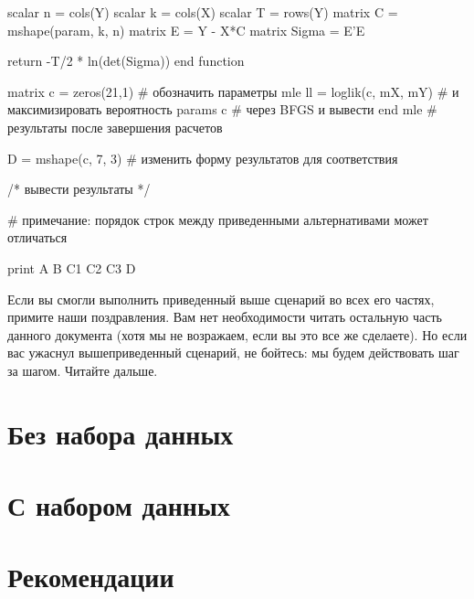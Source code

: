 \documentclass[oneside]{book}
\begin{document}
\begin{scode}
    scalar n = cols(Y)
    scalar k = cols(X)
    scalar T = rows(Y)
    matrix C = mshape(param, k, n)
    matrix E = Y - X*C
    matrix Sigma = E'E

    return -T/2 * ln(det(Sigma))
end function

matrix c = zeros(21,1)                  # обозначить параметры
mle ll = loglik(c, mX, mY)              # и максимизировать вероятность
    params c                            # через BFGS и вывести 
end mle                                 # результаты после завершения расчетов

D = mshape(c, 7, 3)                     # изменить форму результатов для соответствия

/* вывести результаты */

# примечание: порядок строк между приведенными альтернативами может отличаться

print A B C1 C2 C3 D
\end{scode}

Если вы смогли выполнить приведенный выше сценарий во всех его частях,
примите наши поздравления. Вам нет необходимости читать остальную
часть данного документа (хотя мы не возражаем, если вы это все же
сделаете). Но если вас ужаснул вышеприведенный сценарий, не бойтесь:
мы будем действовать шаг за шагом. Читайте дальше.

\part{Без набора данных}
\label{part:hp-nodata}








\part{С набором данных}
\label{part:hp-data}




\part{Рекомендации}
\label{part:hp-reference}





% 

% 
\end{document}
